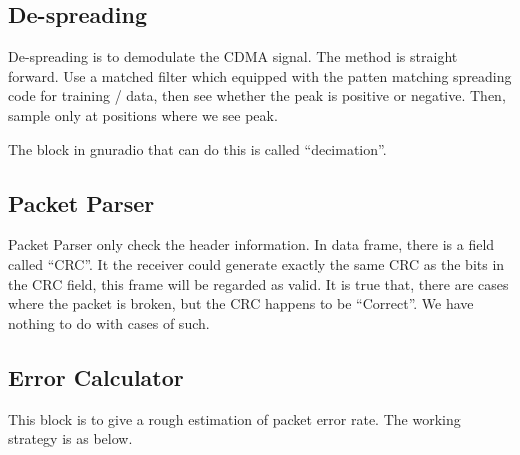 \documentclass[a4paper]{report}
\begin{document}

\subsection{De-spreading} %
\label{sub:De-spreading_strategy}

De-spreading is to demodulate the CDMA signal. The method is straight forward. Use a matched filter which equipped with the patten matching spreading code for training / data, then see whether the peak is positive or negative. Then, sample only at positions where we see peak. 

The block in gnuradio that can do this is called ``decimation''.

\subsection{Packet Parser} %
\label{sub:packet_parser}

Packet Parser only check the header information. In data frame, there is a field called ``CRC''. It the receiver could generate exactly the same CRC as the bits in the CRC field, this frame will be regarded as valid. It is true that, there are cases where the packet is broken, but the CRC happens to be ``Correct''. We have nothing to do with cases of such.

\subsection{Error Calculator} %
\label{sub:error_calculator}

This block is to give a rough estimation of packet error rate. The working strategy is as below.
\end{document}
